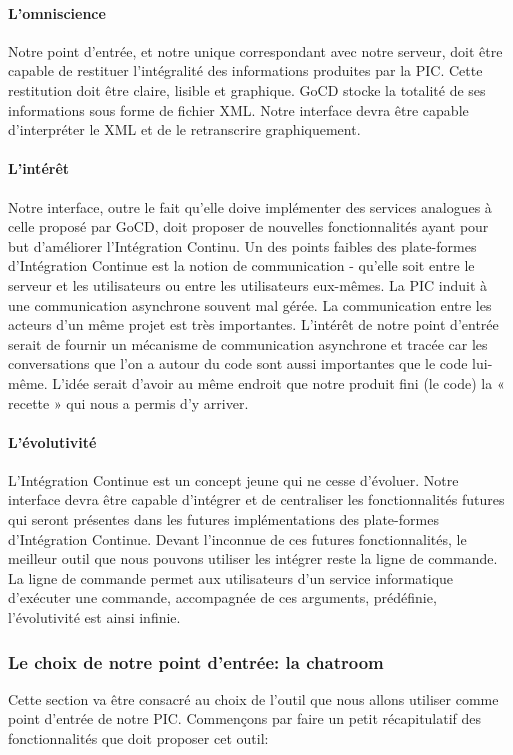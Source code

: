           \paragraph{L'omniscience} Notre point d'entrée, et notre unique correspondant avec notre serveur, doit être capable de restituer l'intégralité des informations produites par la PIC. Cette restitution doit être claire, lisible et graphique.
          GoCD stocke la totalité de ses informations sous forme de fichier XML. Notre interface devra être capable d'interpréter le XML et de le retranscrire graphiquement.

          \paragraph{L'intérêt} Notre interface, outre le fait qu'elle doive implémenter des services analogues à celle proposé par GoCD, doit proposer de nouvelles fonctionnalités ayant pour but d'améliorer l'Intégration Continu.
          Un des points faibles des plate-formes d'Intégration Continue est la notion de communication - qu'elle soit entre le serveur et les utilisateurs ou entre les utilisateurs eux-mêmes. La PIC induit à une communication asynchrone souvent mal gérée. La communication entre les acteurs d'un même projet est très importantes. L'intérêt de notre point d'entrée serait de fournir un mécanisme de communication asynchrone et tracée car les conversations que l'on a autour du code sont aussi importantes que le code lui-même. L'idée serait d'avoir au même endroit que notre produit fini (le code) la « recette » qui nous a permis d'y arriver.

          \paragraph{L'évolutivité} L'Intégration Continue est un concept jeune qui ne cesse d'évoluer. Notre interface devra être capable d'intégrer et de centraliser les fonctionnalités futures qui seront présentes dans les futures implémentations des plate-formes d'Intégration Continue.
          Devant l'inconnue de ces futures fonctionnalités, le meilleur outil que nous pouvons utiliser les intégrer reste la ligne de commande. La ligne de commande permet aux utilisateurs d'un service informatique d'exécuter une commande, accompagnée de ces arguments, prédéfinie, l'évolutivité est ainsi infinie.

        \subsubsection{Le choix de notre point d'entrée: la chatroom}
        Cette section va être consacré au choix de l'outil que nous allons utiliser comme point d'entrée de notre PIC. Commençons par faire un petit récapitulatif des fonctionnalités que doit proposer cet outil:\\

